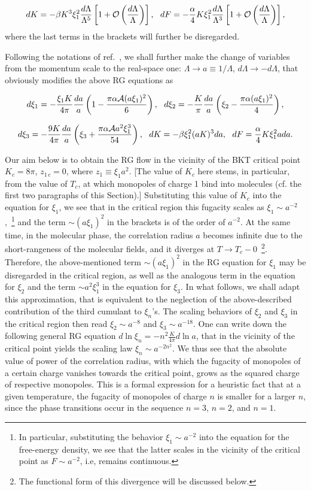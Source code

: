 \documentclass[a4paper,12pt]{article}
\begin{document}
$$
dK=-\beta K^3\xi_1^2\frac{d\Lambda}{\Lambda^5}\left[1+{\cal O}\left(\frac{d\Lambda}{\Lambda}\right)\right],~~
dF=-\frac{\alpha}{4}K\xi_1^2\frac{d\Lambda}{\Lambda^3}\left[1+{\cal O}\left(\frac{d\Lambda}{\Lambda}\right)\right],
$$
where the last terms in the brackets will further be disregarded.

Following the notations of ref.~\cite{kogut}, we shall further make the change of variables from the momentum scale
to the real-space one:
$\Lambda\to a\equiv1/\Lambda$, $d\Lambda\to-d\Lambda$, that obviously modifies the above RG equations as

$$
d\xi_1=-\frac{\xi_1K}{4\pi}\frac{da}{a}\left(1-\frac{\pi\alpha{\cal A}(a\xi_1)^2}{6}\right),~~
d\xi_2=-\frac{K}{\pi}\frac{da}{a}\left(\xi_2-\frac{\pi\alpha (a\xi_1)^2}{4}\right),$$

$$d\xi_3=-\frac{9K}{4\pi}\frac{da}{a}\left(\xi_3+\frac{\pi\alpha{\cal A}a^2\xi_1^3}{54}\right),~~
dK=-\beta \xi_1^2(aK)^3da,~~ dF=\frac{\alpha}{4}K\xi_1^2ada.$$

Our aim below is to obtain the RG flow in the vicinity of the BKT critical point~\cite{bkt, kogut, nk} $K_c=8\pi$, $z_{1{\,}c}=0$, where
$z_1\equiv \xi_1a^2$. [The value of $K_c$ here stems, in particular, from the
value of $T_c$, at which monopoles of charge 1 bind into molecules (cf. the first two paragraphs of this Section).]
Substituting this value of $K_c$ into the equation for $\xi_1$, we see that in the critical region this fugacity scales
as $\xi_1\sim a^{-2}$,~\footnote{In particular, substituting the
behavior $\xi_1\sim a^{-2}$ into the equation for the free-energy density, we see that the latter scales
in the vicinity of the critical point as $F\sim a^{-2}$, i.e, remains continuous.}
and the term $\sim(a\xi_1)^2$ in the brackets is of the order of $a^{-2}$. At the same time,
in the molecular phase, the correlation
radius $a$ becomes infinite due to the short-rangeness of the molecular fields, and it diverges at $T\to T_c-0$~\footnote{The
functional form of this divergence will be discussed below.}. Therefore, the above-mentioned term $\sim(a\xi_1)^2$ in the
RG equation for $\xi_1$ may be disregarded in the critical region, as well as the analogous term in the equation for $\xi_2$
and the term $\sim a^2\xi_1^3$ in the equation for $\xi_3$. In what follows, we shall adapt this approximation, that is
equivalent to the neglection of the above-described contribution of the third cumulant to $\xi_n$'s.
The scaling behaviors of $\xi_2$ and $\xi_3$ in the critical region then read $\xi_2\sim a^{-8}$ and
$\xi_3\sim a^{-18}$. One can write down the following general RG equation $d\ln\xi_n=-n^2
\frac{K}{4\pi}d\ln a$, that in the vicinity of the critical point yields the scaling law $\xi_n\sim a^{-2n^2}$.
We thus see that the absolute value of power of the correlation radius, with which the
fugacity of monopoles of a certain charge vanishes towards the critical point, grows as the squared charge of respective monopoles.
This is a formal expression for a heuristic fact that
at a given temperature, the fugacity of monopoles of charge $n$ is smaller for a larger $n$,
since the phase transitions occur in the
sequence $n=3$, $n=2$, and $n=1$.
\end{document}
